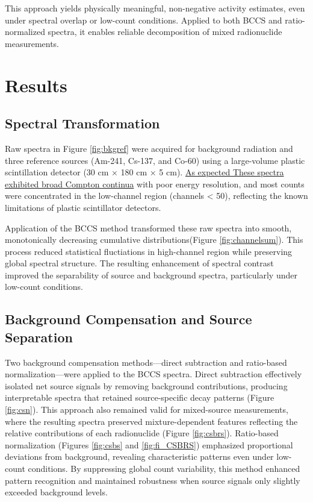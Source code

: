 \documentclass[10pt]{wlscirep}
\begin{document}
This approach yields physically meaningful, non-negative activity estimates, even under spectral overlap or low-count conditions. Applied to both BCCS and ratio-normalized spectra, it enables reliable decomposition of mixed radionuclide measurements.

\section*{Results}


\subsection*{Spectral Transformation}

Raw spectra in Figure \ref{fig:bkgref} were acquired for background radiation and three reference sources (Am-241, Cs-137, and Co-60) using a large-volume plastic scintillation detector (30 cm × 180 cm × 5 cm). \ul{As expected These spectra exhibited broad Compton continua} with poor energy resolution, and most counts were concentrated in the low-channel region (channels < 50), reflecting the known limitations of plastic scintillator detectors.

Application of the BCCS method transformed these raw spectra into smooth, monotonically decreasing cumulative distributions(Figure \ref{fig:channelsum}). This process reduced statistical fluctiations in high-channel region while preserving global spectral structure. The resulting enhancement of spectral contrast improved the separability of source and background spectra, particularly under low-count conditions.

\subsection*{Background Compensation and Source Separation}

Two background compensation methods—direct subtraction and ratio-based normalization—were applied to the BCCS spectra. Direct subtraction effectively isolated net source signals by removing background contributions, producing interpretable spectra that retained source-specific decay patterns (Figure \ref{fig:csn}). This approach also remained valid for mixed-source measurements, where the resulting spectra preserved mixture-dependent features reflecting the relative contributions of each radionuclide (Figure \ref{fig:csbrs}).
Ratio-based normalization (Figures \ref{fig:csbs} and \ref{fig:fi_CSBRS}) emphasized proportional deviations from background, revealing characteristic patterns even under low-count conditions. By suppressing global count variability, this method enhanced pattern recognition and maintained robustness when source signals only slightly exceeded background levels.
\end{document}
